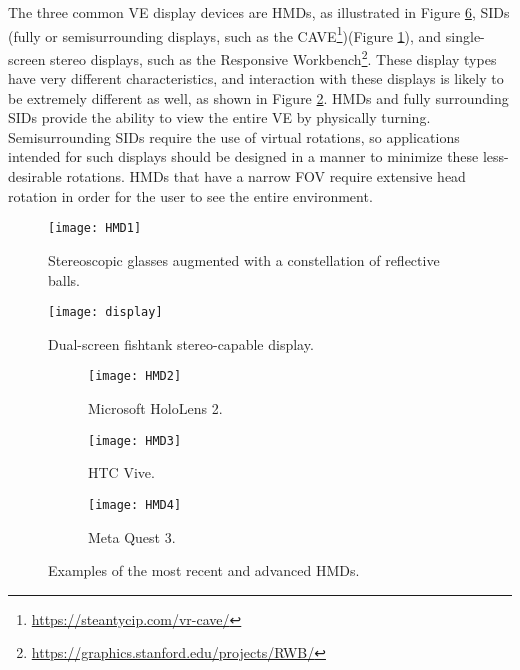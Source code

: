 The three common \gls{VE} display devices are \glspl{HMD}, as illustrated in Figure \ref{fig:HMDs}, \glspl{SID} (fully or 
semisurrounding displays, such as the \gls{CAVE}\footnote{\url{https://steantycip.com/vr-cave/}})(Figure \ref{fig:HMD1}), and single-screen stereo displays, such as the Responsive Workbench\footnote{\url{https://graphics.stanford.edu/projects/RWB/}}. 
These display types have very different characteristics, and interaction with these displays is likely to be extremely different as well, as shown in Figure \ref{fig:display}. HMDs and fully surrounding \glspl{SID} provide the ability to view the entire \gls{VE} by physically turning. Semisurrounding \glspl{SID} require the use of virtual rotations, so applications intended for such 
displays should be designed in a manner to minimize these less-desirable rotations. \glspl{HMD} that have a narrow \gls{FOV} require extensive head rotation in order for the user to see the entire environment. 



\begin{figure}[h!]
    \centering
    \texttt{[image: HMD1]}
    \caption{Stereoscopic glasses augmented with a constellation of reflective balls.~\cite{SHERMAN2019258}} 
    \label{fig:HMD1}
\end{figure}

\begin{figure}[h!]
    \centering
    \texttt{[image: display]}
    \caption{Dual-screen fishtank stereo-capable display.~\cite{SHERMAN2019258}} 
    \label{fig:display}
\end{figure}

\begin{figure}
    \centering
    \begin{subfigure}[b]{0.3\textwidth}
        \centering
        \texttt{[image: HMD2]}
        \caption{Microsoft HoloLens 2.~\cite{headset_article}}
        \label{fig:HM}
    \end{subfigure}
    \begin{subfigure}[b]{0.3\textwidth}
        \centering
        \texttt{[image: HMD3]}
        \caption{HTC Vive.~\cite{SHERMAN2019258}}
        \label{fig:y}
    \end{subfigure}
    \hfill
    \begin{subfigure}[b]{0.3\textwidth}
        \centering
        \texttt{[image: HMD4]}
        \caption{Meta Quest 3.~\cite{article}}
        \label{fig:y}
    \end{subfigure}
       \caption{Examples of the most recent and advanced \glspl{HMD}.}
       \label{fig:HMDs}
  \end{figure}
  \FloatBarrier
  
